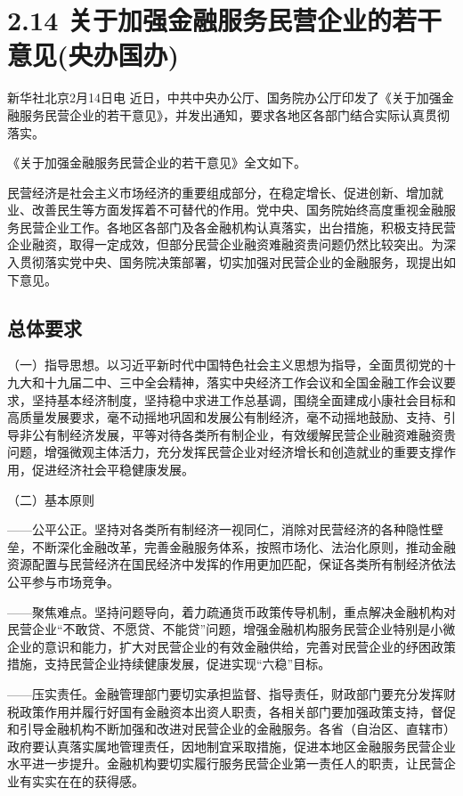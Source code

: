 \chapter{2.14 关于加强金融服务民营企业的若干意见(央办国办)} %

新华社北京2月14日电 近日，中共中央办公厅、国务院办公厅印发了《关于加强金融服务民营企业的若干意见》，并发出通知，要求各地区各部门结合实际认真贯彻落实。

《关于加强金融服务民营企业的若干意见》全文如下。

民营经济是社会主义市场经济的重要组成部分，在稳定增长、促进创新、增加就业、改善民生等方面发挥着不可替代的作用。党中央、国务院始终高度重视金融服务民营企业工作。各地区各部门及各金融机构认真落实，出台措施，积极支持民营企业融资，取得一定成效，但部分民营企业融资难融资贵问题仍然比较突出。为深入贯彻落实党中央、国务院决策部署，切实加强对民营企业的金融服务，现提出如下意见。

\section{总体要求}

（一）指导思想。以习近平新时代中国特色社会主义思想为指导，全面贯彻党的十九大和十九届二中、三中全会精神，落实中央经济工作会议和全国金融工作会议要求，坚持基本经济制度，坚持稳中求进工作总基调，围绕全面建成小康社会目标和高质量发展要求，毫不动摇地巩固和发展公有制经济，毫不动摇地鼓励、支持、引导非公有制经济发展，平等对待各类所有制企业，有效缓解民营企业融资难融资贵问题，增强微观主体活力，充分发挥民营企业对经济增长和创造就业的重要支撑作用，促进经济社会平稳健康发展。

（二）基本原则

——公平公正。坚持对各类所有制经济一视同仁，消除对民营经济的各种隐性壁垒，不断深化金融改革，完善金融服务体系，按照市场化、法治化原则，推动金融资源配置与民营经济在国民经济中发挥的作用更加匹配，保证各类所有制经济依法公平参与市场竞争。

——聚焦难点。坚持问题导向，着力疏通货币政策传导机制，重点解决金融机构对民营企业“不敢贷、不愿贷、不能贷”问题，增强金融机构服务民营企业特别是小微企业的意识和能力，扩大对民营企业的有效金融供给，完善对民营企业的纾困政策措施，支持民营企业持续健康发展，促进实现“六稳”目标。

——压实责任。金融管理部门要切实承担监督、指导责任，财政部门要充分发挥财税政策作用并履行好国有金融资本出资人职责，各相关部门要加强政策支持，督促和引导金融机构不断加强和改进对民营企业的金融服务。各省（自治区、直辖市）政府要认真落实属地管理责任，因地制宜采取措施，促进本地区金融服务民营企业水平进一步提升。金融机构要切实履行服务民营企业第一责任人的职责，让民营企业有实实在在的获得感。

